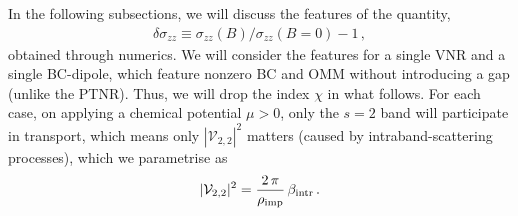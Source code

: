 \documentclass[aps,prb,onecolumn,nofootinbib,citeautoscript,10pt]{revtex4-2}
\begin{document}
In the following subsections, we will discuss the features of the quantity, 
\begin{align}
\delta \sigma_{zz}  \equiv \sigma_{zz} (B) / \sigma_{zz}(B=0)  -1 \,,
\end{align} 
obtained through numerics. We will consider the features for a single VNR and a single BC-dipole, which feature nonzero BC and OMM without introducing a gap (unlike the PTNR). Thus, we will drop the index $\chi $ in what follows. For each case, on applying a chemical potential $\mu > 0$, only the $s=2$ band will participate in transport, which means only $|{\mathcal V}_{ 2,2} |^2$ matters (caused by intraband-scattering processes), which we parametrise as
\begin{align}
 |{\mathcal V}_{ 2,2} |^2 =  \frac{ 2\,\pi} {\rho_{\rm imp}} \, \beta_{\rm intr} \,.
\end{align} 
\end{document}

